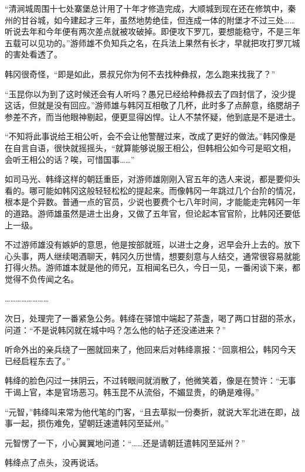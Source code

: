 “清涧城周围十七处寨堡总计用了十年才修造完成，大顺城到现在还在修筑中，秦州的甘谷城，如今建起才三年，虽然地势绝佳，但连成一体的附堡才不过三处……听说去年和今年便有两次差点就被攻破掉。即便攻下罗兀，要想能稳守，不是三年五载可以见功的。”游师雄不负知兵之名，在兵法上果然有长才，早就把攻打罗兀城的害处看透了。

韩冈很奇怪，“即是如此，景叔兄你为何不去找种彝叔，怎么跑来找我了？”

“玉昆你以为到了这时候还会有人听吗？愚兄已经给种彝叔去了四封信了，没少提这话，但就是没有回应。”游师雄与韩冈互相敬了几杯，此时多了点醉意，络腮胡子参差不齐，而当他眼神剔起，便更显得凶悍。让人不禁怀疑，他到底是不是进士。

“不知将此事说给王相公听，会不会让他警醒过来，改成了更好的做法。”韩冈像是在自言自语，很快就摇摇头，“就算能够说服王相公，但韩相公如今可是昭文相，会听王相公的话？唉，可惜国事……”

如司马光、韩绛这样的朝廷重臣，对游师雄刚刚入官五年的选人来说，都是要仰头看的。哪可能如韩冈这般轻轻松松的提起来。而像韩冈一年跳过几个台阶的情况，根本是个异数。普通一点的官员，少说也要费个七八年时间，才能能走完韩冈一年的道路。游师雄虽然是进士出身，又做了五年官，但论起本官官阶，比韩冈还要低上一级。

不过游师雄没有嫉妒的意思，他是按部就班，以进士之身，迟早会升上去的。放下心头事，两人继续喝酒聊天，韩冈久历世情，想要刻意与人结交，通常很容易就能打得火热。游师雄本就是他的师兄，互相闻名已久，今日一见，一番闲谈下来，都觉得不负传闻之名。

……………………

次日，处理完了一番紧急公务。韩绛在驿馆中端起了茶盏，喝了两口甘甜的茶水，问道：“不是说韩冈就在城中吗？怎么他的帖子还没递进来？”

听命外出的亲兵绕了一圈就回来了，他回来后对韩绛禀报：“回禀相公，韩冈今天已经启程东去了。”

韩绛的脸色闪过一抹阴云，不过转眼间就消散了，他微笑着，像是在赞许：“无事干谒上官，本是官场恶习。韩玉昆不从流俗，不媚显贵，的确是难得。”

“元智，”韩绛叫来常为他代笔的门客，“且去草拟一份奏折，就说大军北进在即，战事一起，损伤难免，望朝廷速遣韩冈至延州。”

元智愣了一下，小心翼翼地问道：“……还是请朝廷遣韩冈至延州？”

韩绛点了点头，没再说话。

